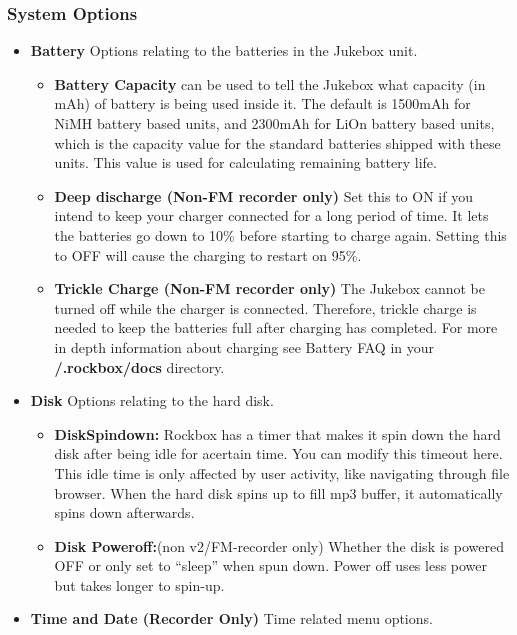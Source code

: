 \subsubsection{\label{ref:SystemOptions}System Options}

\begin{itemize}
\item \textbf{Battery}
Options relating to the batteries in the Jukebox unit.  
\begin{itemize}
\item \textbf{Battery Capacity} can be used to tell the Jukebox what
capacity (in mAh) of battery is being used inside it.  The default is
1500mAh for NiMH battery based units, and 2300mAh for LiOn battery
based units, which is the capacity value for the standard batteries
shipped with these units. This value is used for calculating remaining
battery life.
\item \textbf{Deep discharge (Non{}-FM recorder only)}
Set this to ON if you intend to keep your charger connected for a long
period of time. It lets the batteries go down to 10\% before starting
to charge again. Setting this to OFF will cause the charging to restart
on 95\%.
\item \textbf{Trickle Charge (Non{}-FM recorder only)}
The Jukebox cannot be turned off while the charger is connected.
Therefore, trickle charge is needed to keep the batteries full after
charging has completed. For more in depth information about charging
see Battery FAQ in your \textbf{/.rockbox/docs }directory.
\end{itemize}

\item \textbf{Disk}
Options relating to the hard disk.  

\begin{itemize}
\item \textbf{DiskSpindown:}
Rockbox has a timer that makes it spin down the hard disk after being idle for acertain time. You can modify this timeout here. This idle time is only
affected by user activity, like navigating through file browser. When
the hard disk spins up to fill mp3 buffer, it automatically spins down
afterwards.
\item \textbf{Disk Poweroff:}(non v2/FM{}-recorder only)
Whether the disk is powered OFF or only set to ``sleep'' when spun
down. Power off uses less power but takes longer to spin{}-up.
\end{itemize}

\item \textbf{Time and Date (Recorder Only)}
Time related menu options.


\end{itemize}

